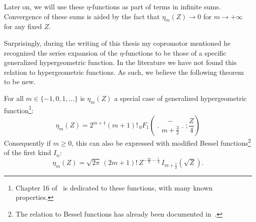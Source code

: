 Later on, we will use these $\eta$-functions as part of terms in infinite sums. Convergence of these sums is aided by the fact that $\eta_m(Z) \to 0$ for $m \to + \infty$ for any fixed $Z$.

Surprisingly, during the writing of this thesis my copromotor mentioned he recognized the series expansion of the $\eta$-functions to be those of a specific generalized hypergeometric function. In the literature we have not found this relation to hypergeometric functions. As such, we believe the following theorem to be new.

\begin{theorem} For all $m \in \{-1, 0, 1, \dots\}$ is $\eta_m(Z)$ a special case of generalized hypergeometric function\footnote{Chapter 16 of~\cite{nist_dlmf} is dedicated to these functions, with many known properties.}:
    \begin{equation}\label{equ:c4_eta_as_hypergeometric}
        \eta_m(Z) = 2^{m+1}(m+1)!\, {}_0F_1\left(\genfrac..{0pt}{}{ - }{m+\frac{3}{2}}; \frac{Z}{4}\right)
    \end{equation}
    Consequently if $m \geq 0$, this can also be expressed with modified Bessel functions\footnote{The relation to Bessel functions has already been documented in~\cite{ixaru_exponential_2004}.} of the first kind $I_\alpha$:
    $$
        \eta_m(Z) = \sqrt{2\pi} \,(2m+1)! \, Z^{-\frac{m}{2} - \frac{1}{4}} \, I_{m + \frac{1}{2}}\left(\sqrt{Z}\right)\text{.}
    $$
\end{theorem}
